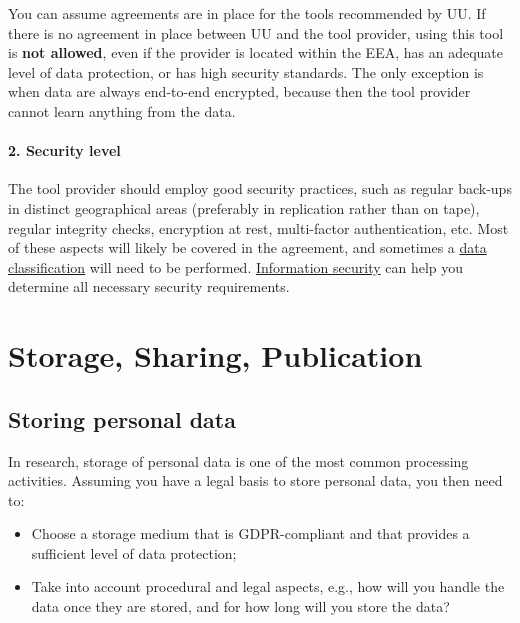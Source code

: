 \documentclass[
]{book}
\providecommand{\tightlist}{%
  \setlength{\itemsep}{0pt}\setlength{\parskip}{0pt}}
\begin{document}
You can assume agreements are in place for the tools recommended by UU.
If there is no agreement in place between UU and the tool provider, using
this tool is \textbf{not allowed}, even if the provider is located within the EEA,
has an adequate level of data protection, or has high security standards. The
only exception is when data are always end-to-end encrypted, because then the
tool provider cannot learn anything from the data.

\hypertarget{security-level}{%
\subsection{2. Security level}\label{security-level}}

The tool provider should employ good security practices, such as regular back-ups
in distinct geographical areas (preferably in replication rather than on tape),
regular integrity checks, encryption at rest, multi-factor authentication, etc.
Most of these aspects will likely be covered in the agreement, and sometimes a
\protect\hyperlink{data-classification}{data classification} will need to be performed.
\protect\hyperlink{support}{Information security} can help you determine all necessary security requirements.

\hypertarget{part-storage-sharing-publication}{%
\part*{Storage, Sharing, Publication}\label{part-storage-sharing-publication}}

\hypertarget{data-storage}{%
\chapter{Storing personal data}\label{data-storage}}

In research, storage of personal data is one of the most common processing
activities. Assuming you have a legal basis to store personal data, you
then need to:

\begin{itemize}
\tightlist
\item
  Choose a storage medium that is GDPR-compliant and that provides a sufficient
  level of data protection;
\item
  Take into account procedural and legal aspects, e.g., how will you handle the
  data once they are stored, and for how long will you store the data?
\end{itemize}
\end{document}
